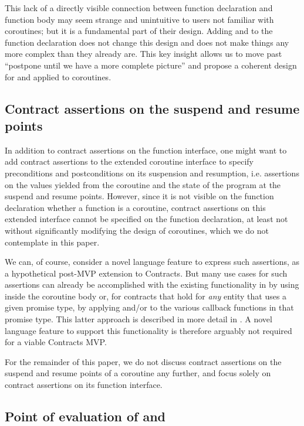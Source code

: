 This lack of a directly visible connection between function declaration and function body may seem strange and unintuitive to users not familiar with coroutines; but it is a fundamental part of their design. Adding  and  to the function declaration does not change this design and does not make things any more complex than they already are. This key insight allows us to move past ``postpone until we have a more complete picture'' and propose a coherent design for  and  applied to coroutines.

\subsection{Contract assertions on the suspend and resume points}

In addition to contract assertions on the function interface, one might want to add contract assertions to the extended coroutine interface to specify preconditions and postconditions on its suspension and resumption, i.e. assertions on the values yielded from the coroutine and the state of the program at the suspend and resume points. However, since it is not visible on the function declaration whether a function is a coroutine, contract assertions on this extended interface cannot be specified on the function declaration, at least not without significantly modifying the design of coroutines, which we do not contemplate in this paper.

We can, of course, consider a novel language feature to express such assertions, as a hypothetical post-MVP extension to Contracts. But many use cases for such assertions can already be accomplished with the existing functionality in \cite{P2900R8} by using  inside the coroutine body or, for contracts that hold for \emph{any} entity that uses a given promise type, by applying  and/or  to the various callback functions in that promise type. This latter approach is described in more detail in \cite{P3251R0}. A novel language feature to support this functionality is therefore arguably not required for a viable Contracts MVP.

For the remainder of this paper, we do not discuss contract assertions on the suspend and resume points of a coroutine any further, and focus solely on contract assertions on its function interface.

\subsection{Point of evaluation of  and }

